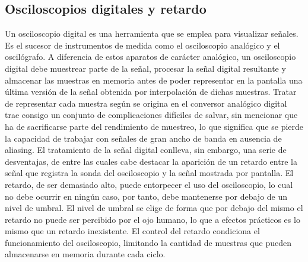 \subsection{Osciloscopios digitales y retardo}

Un osciloscopio digital es una herramienta que se emplea para visualizar
señales. Es el sucesor de instrumentos de medida como el osciloscopio
analógico y el oscilógrafo. A diferencia de estos aparatos de carácter
analógico, un osciloscopio digital debe muestrear parte de la señal,
procesar la señal digital resultante y almacenar las muestras en memoria
antes de poder representar en la pantalla una última versión de la señal
obtenida por interpolación de dichas muestras. Tratar de representar cada
muestra según se origina en el conversor analógico digital trae consigo un
conjunto de complicaciones difíciles de salvar, sin mencionar que ha de
sacrificarse parte del rendimiento de muestreo, lo que significa que se
pierde la capacidad de trabajar con señales de gran ancho de banda en
ausencia de aliasing. El tratamiento de la señal digital conlleva, sin
embargo, una serie de desventajas, de entre las cuales cabe destacar la
aparición de un retardo entre la señal que registra la sonda del
osciloscopio y la señal mostrada por pantalla. El retardo, de ser demasiado
alto, puede entorpecer el uso del osciloscopio, lo cual no debe ocurrir en
ningún caso, por tanto, debe mantenerse por debajo de un nivel de umbral.
El nivel de umbral se elige de forma que por debajo del mismo el retardo no
puede ser percibido por el ojo humano, lo que a efectos prácticos es lo
mismo que un retardo inexistente. El control del retardo condiciona el
funcionamiento del osciloscopio, limitando la cantidad de muestras que
pueden almacenarse en memoria durante cada ciclo.


